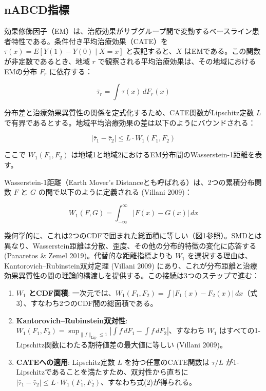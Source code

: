 \documentclass[
  a4paper,
  11pt]{ltjsarticle}
\providecommand{\tightlist}{%
  \setlength{\itemsep}{0pt}\setlength{\parskip}{0pt}}\usepackage{longtable,booktabs,array}
\begin{document}
\subsection{nABCD指標}\label{nabcdux6307ux6a19}

効果修飾因子（EM）は、治療効果がサブグループ間で変動するベースライン患者特性である。条件付き平均治療効果（CATE）を
\(\tau(x) = E[Y(1) - Y(0) \mid X = x]\) と表記すると、\(X\)
はEMである。この関数が非定数であるとき、地域 \(r\)
で観察される平均治療効果は、その地域におけるEMの分布 \(F_r\)
に依存する：

\[\bar{\tau}_r = \int \tau(x) \, dF_r(x) \tag{1}\]

分布差と治療効果異質性の関係を定式化するため、CATE関数がLipschitz定数
\(L\)
で有界であるとする。地域平均治療効果の差は以下のようにバウンドされる：

\[|\bar{\tau}_1 - \bar{\tau}_2| \leq L \cdot W_1(F_1, F_2) \tag{2}\]

ここで \(W_1(F_1, F_2)\)
は地域1と地域2におけるEM分布間のWasserstein-1距離を表す。

Wasserstein-1距離（Earth Mover's
Distanceとも呼ばれる）は、2つの累積分布関数 \(F\) と \(G\)
の間で以下のように定義される (Villani 2009)：

\[W_1(F, G) = \int_{-\infty}^{\infty} |F(x) - G(x)| \, dx \tag{3}\]

幾何学的に、これは2つのCDFで囲まれた総面積に等しい（図1参照）。SMDとは異なり、Wasserstein距離は分散、歪度、その他の分布的特徴の変化に応答する
(Panaretos \& Zemel 2019)。代替的な距離指標よりも \(W_1\)
を選択する理由は、Kantorovich--Rubinstein双対定理 (Villani 2009)
にあり、これが分布距離と治療効果異質性の間の理論的橋渡しを提供する。この接続は3つのステップで進む：

\begin{enumerate}
\def\labelenumi{\arabic{enumi}.}
\tightlist
\item
  \textbf{\(W_1\) とCDF面積}:
  一次元では、\(W_1(F_1, F_2) = \int |F_1(x) - F_2(x)| \, dx\)（式3）、すなわち2つのCDF間の総面積である。
\item
  \textbf{Kantorovich--Rubinstein双対性}:
  \(W_1(F_1, F_2) = \sup_{\|f\|_{\text{Lip}} \leq 1} |\int f \, dF_1 - \int f \, dF_2|\)、すなわち
  \(W_1\) はすべての1-Lipschitz関数にわたる期待値差の最大値に等しい
  (Villani 2009)。
\item
  \textbf{CATEへの適用}: Lipschitz定数 \(L\) を持つ任意のCATE関数は
  \(\tau/L\) が1-Lipschitzであることを満たすため、双対性から直ちに
  \(|\bar{\tau}_1 - \bar{\tau}_2| \leq L \cdot W_1(F_1, F_2)\)、すなわち式(2)が得られる。
\end{enumerate}
\end{document}
